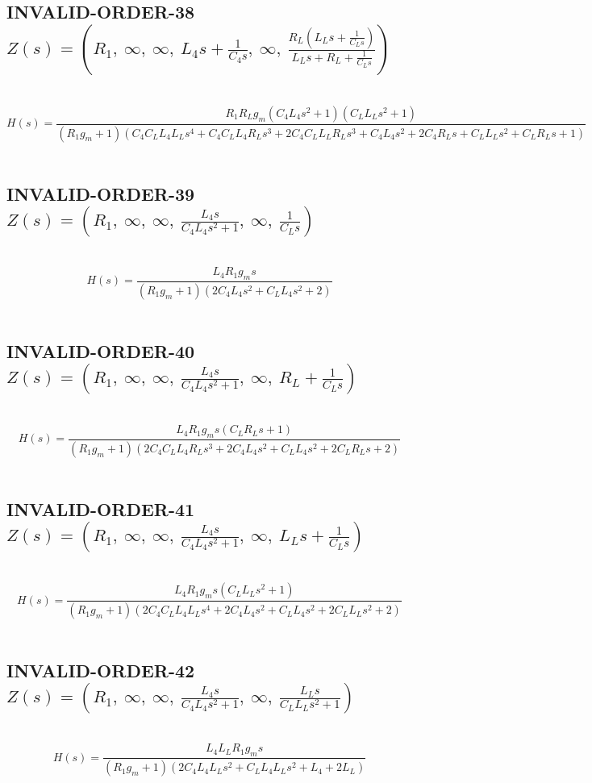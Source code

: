 \documentclass{article}
\begin{document}
\subsection{INVALID-ORDER-38 $Z(s) = \left( R_{1}, \  \infty, \  \infty, \  L_{4} s + \frac{1}{C_{4} s}, \  \infty, \  \frac{R_{L} \left(L_{L} s + \frac{1}{C_{L} s}\right)}{L_{L} s + R_{L} + \frac{1}{C_{L} s}}\right)$ } \ 
\textbf{\[H(s) = \frac{R_{1} R_{L} g_{m} \left(C_{4} L_{4} s^{2} + 1\right) \left(C_{L} L_{L} s^{2} + 1\right)}{\left(R_{1} g_{m} + 1\right) \left(C_{4} C_{L} L_{4} L_{L} s^{4} + C_{4} C_{L} L_{4} R_{L} s^{3} + 2 C_{4} C_{L} L_{L} R_{L} s^{3} + C_{4} L_{4} s^{2} + 2 C_{4} R_{L} s + C_{L} L_{L} s^{2} + C_{L} R_{L} s + 1\right)}\] } \ 
\subsection{INVALID-ORDER-39 $Z(s) = \left( R_{1}, \  \infty, \  \infty, \  \frac{L_{4} s}{C_{4} L_{4} s^{2} + 1}, \  \infty, \  \frac{1}{C_{L} s}\right)$ } \ 
\textbf{\[H(s) = \frac{L_{4} R_{1} g_{m} s}{\left(R_{1} g_{m} + 1\right) \left(2 C_{4} L_{4} s^{2} + C_{L} L_{4} s^{2} + 2\right)}\] } \ 
\subsection{INVALID-ORDER-40 $Z(s) = \left( R_{1}, \  \infty, \  \infty, \  \frac{L_{4} s}{C_{4} L_{4} s^{2} + 1}, \  \infty, \  R_{L} + \frac{1}{C_{L} s}\right)$ } \ 
\textbf{\[H(s) = \frac{L_{4} R_{1} g_{m} s \left(C_{L} R_{L} s + 1\right)}{\left(R_{1} g_{m} + 1\right) \left(2 C_{4} C_{L} L_{4} R_{L} s^{3} + 2 C_{4} L_{4} s^{2} + C_{L} L_{4} s^{2} + 2 C_{L} R_{L} s + 2\right)}\] } \ 
\subsection{INVALID-ORDER-41 $Z(s) = \left( R_{1}, \  \infty, \  \infty, \  \frac{L_{4} s}{C_{4} L_{4} s^{2} + 1}, \  \infty, \  L_{L} s + \frac{1}{C_{L} s}\right)$ } \ 
\textbf{\[H(s) = \frac{L_{4} R_{1} g_{m} s \left(C_{L} L_{L} s^{2} + 1\right)}{\left(R_{1} g_{m} + 1\right) \left(2 C_{4} C_{L} L_{4} L_{L} s^{4} + 2 C_{4} L_{4} s^{2} + C_{L} L_{4} s^{2} + 2 C_{L} L_{L} s^{2} + 2\right)}\] } \ 
\subsection{INVALID-ORDER-42 $Z(s) = \left( R_{1}, \  \infty, \  \infty, \  \frac{L_{4} s}{C_{4} L_{4} s^{2} + 1}, \  \infty, \  \frac{L_{L} s}{C_{L} L_{L} s^{2} + 1}\right)$ } \ 
\textbf{\[H(s) = \frac{L_{4} L_{L} R_{1} g_{m} s}{\left(R_{1} g_{m} + 1\right) \left(2 C_{4} L_{4} L_{L} s^{2} + C_{L} L_{4} L_{L} s^{2} + L_{4} + 2 L_{L}\right)}\] } \ 
\end{document}
